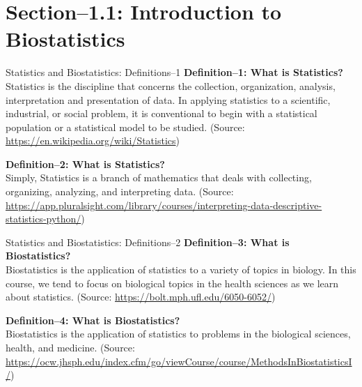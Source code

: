 

\maketitle
\section{Section--1.1: Introduction to Biostatistics}

\begin{frame}[t]{Statistics and Biostatistics: Definitions--1}
	\textbf{Definition--1: What is Statistics?} \\
	Statistics is the discipline that concerns the collection, organization, 
	analysis, interpretation and presentation of data. In applying statistics 
	to a scientific, industrial, or social problem, it is conventional to begin 
	with a statistical population or a statistical model to be studied. 
	(Source: \url{https://en.wikipedia.org/wiki/Statistics})
	
	\textbf{Definition--2: What is Statistics?}\\ 
	Simply, Statistics is a branch of mathematics that deals with collecting,
	organizing, analyzing, and interpreting data. 
	(Source: 
	\url{https://app.pluralsight.com/library/courses/interpreting-data-descriptive-statistics-python/})
	 
\end{frame}


\begin{frame}[t]{Statistics and Biostatistics: Definitions--2}
	\textbf{Definition--3: What is Biostatistics?} \\
	Biostatistics is the application of statistics to a variety of topics in 
	biology. In this course, we tend to focus on biological topics in the 
	health sciences as we learn about statistics. 
	(Source: \url{https://bolt.mph.ufl.edu/6050-6052/}) \\ 
	
	\vspace{6pt}
	
	\textbf{Definition--4: What is Biostatistics?} \\
	Biostatistics is the application of statistics to problems in the
	biological sciences, health, and medicine.
	(Source: 
	\url{https://ocw.jhsph.edu/index.cfm/go/viewCourse/course/MethodsInBiostatisticsI/})
	
\end{frame}



